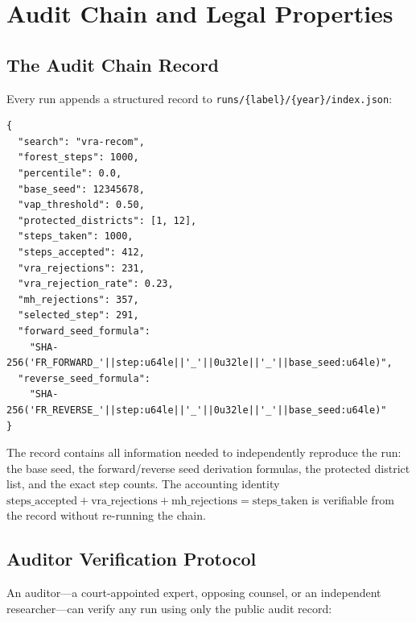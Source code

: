 \section{Audit Chain and Legal Properties}
\label{sec:audit}

\subsection{The Audit Chain Record}

Every \vr{} run appends a structured record to
\texttt{runs/\{label\}/\{year\}/index.json}:

\begin{verbatim}
{
  "search": "vra-recom",
  "forest_steps": 1000,
  "percentile": 0.0,
  "base_seed": 12345678,
  "vap_threshold": 0.50,
  "protected_districts": [1, 12],
  "steps_taken": 1000,
  "steps_accepted": 412,
  "vra_rejections": 231,
  "vra_rejection_rate": 0.23,
  "mh_rejections": 357,
  "selected_step": 291,
  "forward_seed_formula":
    "SHA-256('FR_FORWARD_'||step:u64le||'_'||0u32le||'_'||base_seed:u64le)",
  "reverse_seed_formula":
    "SHA-256('FR_REVERSE_'||step:u64le||'_'||0u32le||'_'||base_seed:u64le)"
}
\end{verbatim}

The record contains all information needed to independently reproduce the run:
the base seed, the forward/reverse seed derivation formulas, the protected
district list, and the exact step counts.
The accounting identity
$\text{steps\_accepted} + \text{vra\_rejections} + \text{mh\_rejections} =
\text{steps\_taken}$ is verifiable from the record without re-running the chain.

\subsection{Auditor Verification Protocol}

An auditor---a court-appointed expert, opposing counsel, or an independent
researcher---can verify any \vr{} run using only the public audit record:

